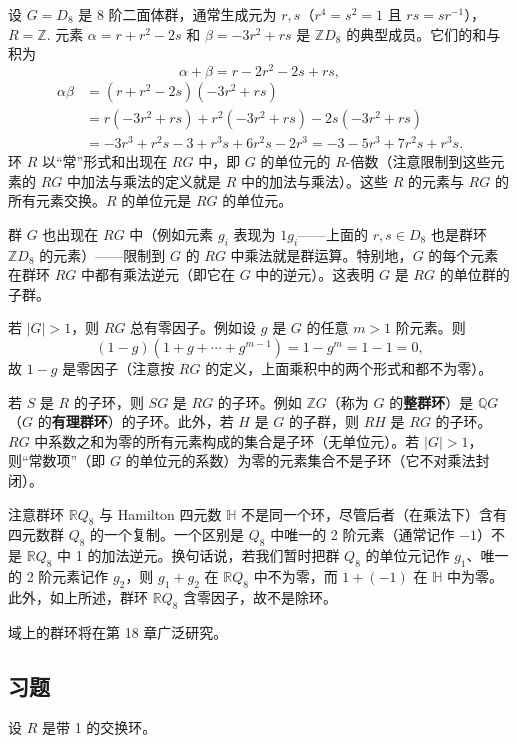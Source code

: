 \begin{example}
设 \(G = D_8\) 是 8 阶二面体群，通常生成元为 \(r, s\)（\(r^4 = s^2 = 1\) 且 \(rs = sr^{-1}\)），\(R = \mathbb{Z}\). 元素 \(\alpha = r + r^2 - 2s\) 和 \(\beta = -3r^2 + rs\) 是 \(\mathbb{Z}D_8\) 的典型成员。它们的和与积为
\[
\alpha + \beta = r - 2r^2 - 2s + rs,
\]
\[
\begin{aligned}
\alpha\beta &= (r + r^2 - 2s)(-3r^2 + rs) \\
&= r(-3r^2 + rs) + r^2(-3r^2 + rs) - 2s(-3r^2 + rs) \\
&= -3r^3 + r^2s - 3 + r^3s + 6r^2s - 2r^3 = -3 - 5r^3 + 7r^2s + r^3s.
\end{aligned}
\]
环 \(R\) 以“常”形式和出现在 \(RG\) 中，即 \(G\) 的单位元的 \(R\)-倍数（注意限制到这些元素的 \(RG\) 中加法与乘法的定义就是 \(R\) 中的加法与乘法）。这些 \(R\) 的元素与 \(RG\) 的所有元素交换。\(R\) 的单位元是 \(RG\) 的单位元。

群 \(G\) 也出现在 \(RG\) 中（例如元素 \(g_i\) 表现为 \(1g_i\)——上面的 \(r, s \in D_8\) 也是群环 \(\mathbb{Z}D_8\) 的元素）——限制到 \(G\) 的 \(RG\) 中乘法就是群运算。特别地，\(G\) 的每个元素在群环 \(RG\) 中都有乘法逆元（即它在 \(G\) 中的逆元）。这表明 \(G\) 是 \(RG\) 的单位群的子群。

若 \(|G| > 1\)，则 \(RG\) 总有零因子。例如设 \(g\) 是 \(G\) 的任意 \(m > 1\) 阶元素。则
\[
(1-g)(1 + g + \cdots + g^{m-1}) = 1 - g^m = 1 - 1 = 0,
\]
故 \(1-g\) 是零因子（注意按 \(RG\) 的定义，上面乘积中的两个形式和都不为零）。

若 \(S\) 是 \(R\) 的子环，则 \(SG\) 是 \(RG\) 的子环。例如 \(\mathbb{Z}G\)（称为 \(G\) 的\textbf{整群环}）是 \(\mathbb{Q}G\)（\(G\) 的\textbf{有理群环}）的子环。此外，若 \(H\) 是 \(G\) 的子群，则 \(RH\) 是 \(RG\) 的子环。\(RG\) 中系数之和为零的所有元素构成的集合是子环（无单位元）。若 \(|G| > 1\)，则“常数项”（即 \(G\) 的单位元的系数）为零的元素集合不是子环（它不对乘法封闭）。

注意群环 \(\mathbb{R}Q_8\) 与 Hamilton 四元数 \(\mathbb{H}\) 不是同一个环，尽管后者（在乘法下）含有四元数群 \(Q_8\) 的一个复制。一个区别是 \(Q_8\) 中唯一的 2 阶元素（通常记作 \(-1\)）不是 \(\mathbb{R}Q_8\) 中 1 的加法逆元。换句话说，若我们暂时把群 \(Q_8\) 的单位元记作 \(g_1\)、唯一的 2 阶元素记作 \(g_2\)，则 \(g_1 + g_2\) 在 \(\mathbb{R}Q_8\) 中不为零，而 \(1 + (-1)\) 在 \(\mathbb{H}\) 中为零。此外，如上所述，群环 \(\mathbb{R}Q_8\) 含零因子，故不是除环。
\end{example}

域上的群环将在第 18 章广泛研究。

\subsection*{习题}
设 \(R\) 是带 1 的交换环。

